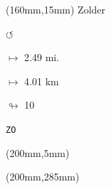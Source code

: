 \begin{textblock*}{40mm}(160mm,15mm)%
Zolder
\par \Huge$\circlearrowleft$
\Large
\par$\mapsto$ 2.49 mi.
\par$\mapsto$ 4.01 km
\par$\looparrowright$ 10
\par\hfill\tiny\tt ZO\\
\end{textblock*}
\begin{textblock*}{20mm}(200mm,5mm)%
\fbox{\thepage}
\end{textblock*}
\begin{textblock*}{20mm}(200mm,285mm)%
\fbox{\thepage}
\end{textblock*}
\null\newpage

